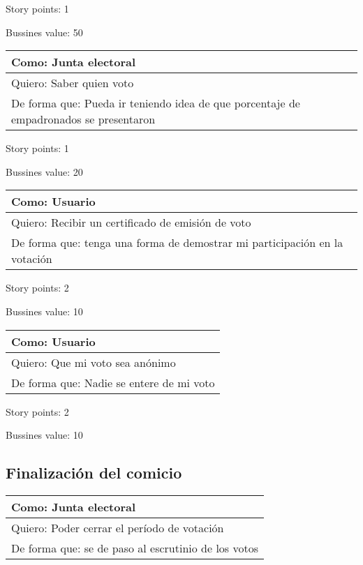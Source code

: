 \medskip
Story points: 1

\medskip
Bussines value: 50


\bigskip

\begin{tabular}{|l|}
\hline
Como: Junta electoral\\
\hline
Quiero: Saber quien voto\\
\hline
De forma que: Pueda ir teniendo idea de que porcentaje de empadronados se presentaron\\
\hline
\end{tabular}

\medskip
Story points: 1

\medskip
Bussines value: 20


\bigskip

\begin{tabular}{|l|}
\hline
Como: Usuario\\
\hline
Quiero: Recibir un certificado de emisi\'on de voto\\
\hline
De forma que: tenga una forma de demostrar mi participaci\'on en la votaci\'on\\
\hline
\end{tabular}

\medskip
Story points: 2

\medskip
Bussines value: 10


\bigskip

\begin{tabular}{|l|}
\hline
Como: Usuario\\
\hline
Quiero: Que mi voto sea an\'onimo\\
\hline
De forma que: Nadie se entere de mi voto  \\
\hline
\end{tabular}

\medskip
Story points: 2

\medskip
Bussines value: 10

\bigskip

\subsection*{Finalizaci\'on del comicio}

\begin{tabular}{|l|}
\hline
Como: Junta electoral\\
\hline
Quiero: Poder cerrar el per\'iodo de votaci\'on\\
\hline
De forma que: se de paso al escrutinio de los votos\\
\hline
\end{tabular}

